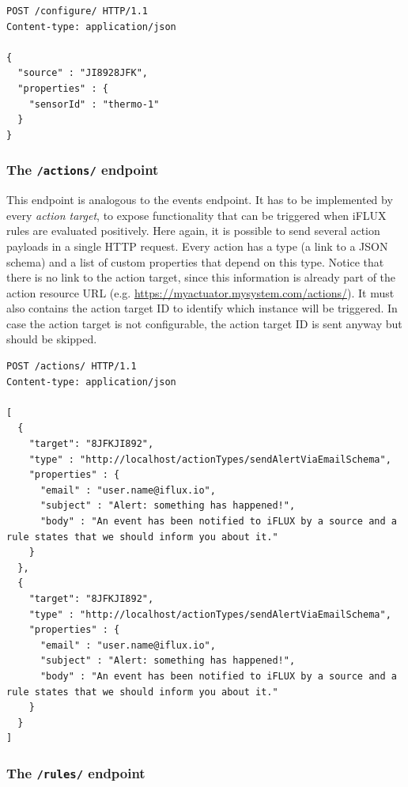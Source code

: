 \begin{lstlisting}
POST /configure/ HTTP/1.1
Content-type: application/json

{
  "source" : "JI8928JFK",
  "properties" : {
    "sensorId" : "thermo-1"
  }
}
\end{lstlisting}

\subsubsection{The \texttt{/actions/} endpoint}

This endpoint is analogous to the events endpoint. It has to be implemented by every \emph{action target}, to expose functionality that can be triggered when iFLUX rules are evaluated positively. Here again, it is possible to send several action payloads in a single HTTP request. Every action has a type (a link to a JSON schema) and a list of custom properties that depend on this type. Notice that there is no link to the action target, since this information is already part of the action resource URL (e.g. \url{https://myactuator.mysystem.com/actions/}). It must also contains the action target ID to identify which instance will be triggered. In case the action target is not configurable, the action target ID is sent anyway but should be skipped.

\begin{lstlisting}
POST /actions/ HTTP/1.1
Content-type: application/json

[
  {
    "target": "8JFKJI892",
    "type" : "http://localhost/actionTypes/sendAlertViaEmailSchema",
    "properties" : {
      "email" : "user.name@iflux.io",
      "subject" : "Alert: something has happened!",
      "body" : "An event has been notified to iFLUX by a source and a rule states that we should inform you about it."
    }
  },
  {
    "target": "8JFKJI892",
    "type" : "http://localhost/actionTypes/sendAlertViaEmailSchema",
    "properties" : {
      "email" : "user.name@iflux.io",
      "subject" : "Alert: something has happened!",
      "body" : "An event has been notified to iFLUX by a source and a rule states that we should inform you about it."
    }
  }
]
\end{lstlisting}

\subsubsection{The \texttt{/rules/} endpoint}

